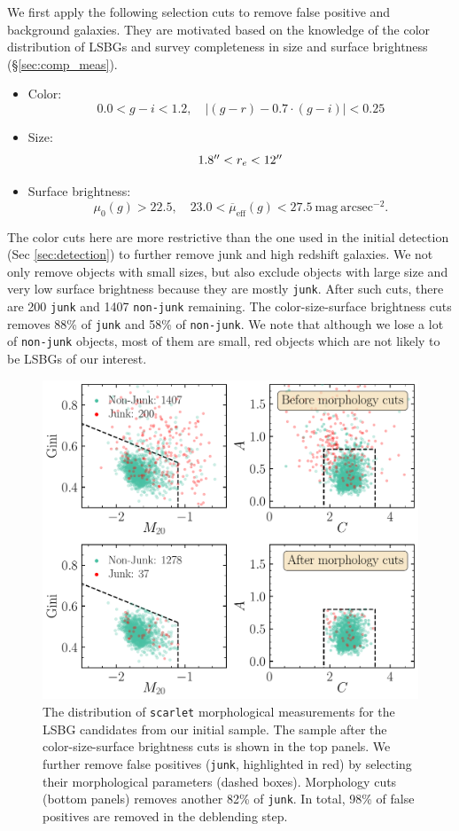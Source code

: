 \documentclass[twocolumn,astrosymb,twocolappendix]{aastex631}
\newcommand{\sbunit}{\mathrm{mag\ arcsec}^{-2}}
\newcommand{\sbeff}{\overline{\mu}_{\mathrm{eff}}(g)}
\newcommand{\code}[1]{\texttt{#1}}
\begin{document}
\begin{CJK*}{UTF8}{gbsn}
We first apply the following selection cuts to remove false positive and background galaxies. They are motivated based on the knowledge of the color distribution of LSBGs \citep[e.g.,][]{SAGA-I,Greco2018,Zaritsky2019,Tanoglidis2021} and survey completeness in size and surface brightness (\S\ref{sec:comp_meas}). 
\begin{itemize}
    \item Color:
    \[0.0 < g-i < 1.2,\quad |(g-r) - 0.7\cdot (g-i)| < 0.25\]
    \item Size: \[1.8 \mbox{$^{\prime\prime}$} < r_e < 12 \mbox{$^{\prime\prime}$}\]
    \item Surface brightness: \[\mu_0(g) > 22.5,\quad 23.0 < \sbeff < 27.5\ \sbunit.\]
\end{itemize}
The color cuts here are more restrictive than the one used in the initial detection (Sec \ref{sec:detection}) to further remove junk and high redshift galaxies. We not only remove objects with small sizes, but also exclude objects with large size and very low surface brightness because they are mostly \code{junk}.
After such cuts, there are 200 \code{junk} and 1407 \code{non-junk} remaining. The color-size-surface brightness cuts removes 88\% of \code{junk} and 58\% of \code{non-junk}. We note that although we lose a lot of \code{non-junk} objects, most of them are small, red  objects which are not likely to be LSBGs of our interest. 


\begin{figure}
    \centering
    \includegraphics[width=1\linewidth]{deblending_cuts_morph.pdf}
    \caption{The distribution of \code{scarlet} morphological measurements for the LSBG candidates from our initial sample. The sample after the color-size-surface brightness cuts is shown in the top panels. We further remove false positives (\code{junk}, highlighted in red) by selecting their morphological parameters (dashed boxes). Morphology cuts (bottom panels) removes another 82\% of \code{junk}. In total, 98\% of false positives are removed in the deblending step.
	}
	\label{fig:deblending_cuts}
\end{figure}


\end{CJK*}
\end{document}
